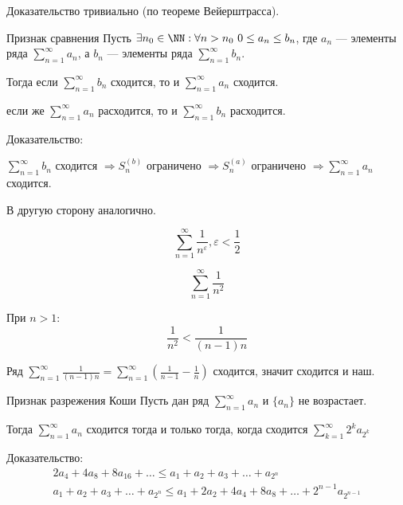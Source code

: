 Доказательство тривиально (по теореме Вейерштрасса).

\begin{prop}{Признак сравнения}{}
    Пусть \( \exists n_0 \in \NN : \forall n > n_0 \ 0 \leq a_n \leq b_n \), 
    где \( a_n \) --- элементы ряда \( \sum\limits_{n = 1}^{\infty} a_n \),
    а \( b_n \) --- элементы ряда \( \sum\limits_{n = 1}^{\infty} b_n \).

    Тогда если \( \sum\limits_{n = 1}^{\infty} b_n \) сходится, то и \( \sum\limits_{n = 1}^{\infty} a_n \) сходится.

    если же \( \sum\limits_{n = 1}^{\infty} a_n \) расходится, то и \( \sum\limits_{n = 1}^{\infty} b_n \) расходится.
\end{prop}

Доказательство:

\( \sum\limits_{n = 1}^{\infty} b_n\) сходится \( \Rightarrow S_n^{(b)} \) ограничено 
\( \Rightarrow S_n^{(a)} \) ограничено \( \Rightarrow \sum\limits_{n = 1}^{\infty} a_n \) сходится.

В другую сторону аналогично.

\begin{example}{}{}
    \[
        \sum\limits_{n = 1}^{\infty} \frac{1}{n^{\varepsilon}}, \varepsilon < \frac{1}{2} 
    \]
\end{example}

\begin{example}{}{}
    \[
        \sum\limits_{n = 1}^{\infty} \frac{1}{n^2}
    \]
\end{example}

При \( n > 1 \):
\[
    \frac{1}{n^2} < \frac{1}{(n - 1)n}
\]

Ряд
\( 
    \sum\limits_{n = 1}^{\infty} \frac{1}{(n - 1)n} = \sum\limits_{n = 1}^{\infty} \left( \frac{1}{n - 1} - \frac{1}{n} \right) 
\)
сходится, значит сходится и наш.

\begin{prop}{Признак разрежения Коши}{}
    Пусть дан ряд \( \sum\limits_{n = 1}^{\infty} a_n \) и \( \{ a_n \} \) не возрастает.

    Тогда 
    \( 
        \sum\limits_{n = 1}^{\infty} a_n \) сходится тогда и только тогда, когда сходится \( \sum\limits_{k = 1}^{\infty} 2^k a_{2^k} 
    \)
\end{prop}

Доказательство:
\begin{gather*}
    2 a_4 + 4 a_8 + 8 a_{16} + \ldots \leq a_1 + a_2 + a_3 + \ldots + a_{2^n}
    \\
    a_1 + a_2 + a_3 + \ldots + a_{2^n} \leq a_1 + 2 a_2 + 4 a_4 + 8 a_8 + \ldots + 2^{n - 1} a_{2^{n - 1}}
\end{gather*}

